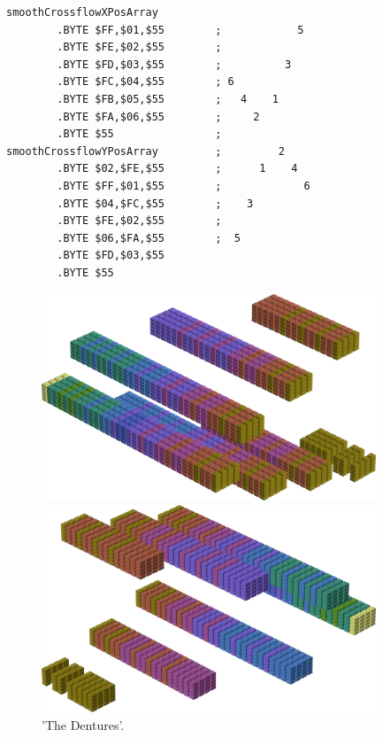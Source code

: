 \begin{minipage}[b]{0.48\linewidth}
\begin{lrbox}{\mybox}%
\begin{lstlisting}[basicstyle=\ttfamily\tiny,escapechar=\%]
smoothCrossflowXPosArray
        .BYTE $FF,$01,$55        ;            5
        .BYTE $FE,$02,$55        ;              
        .BYTE $FD,$03,$55        ;          3   
        .BYTE $FC,$04,$55        ; 6            
        .BYTE $FB,$05,$55        ;   4    1     
        .BYTE $FA,$06,$55        ;     2        
        .BYTE $55                ;              
smoothCrossflowYPosArray         ;         2    
        .BYTE $02,$FE,$55        ;      1    4  
        .BYTE $FF,$01,$55        ;             6
        .BYTE $04,$FC,$55        ;    3         
        .BYTE $FE,$02,$55        ;              
        .BYTE $06,$FA,$55        ;  5           
        .BYTE $FD,$03,$55
        .BYTE $55
\end{lstlisting}
\end{lrbox}%
\scalebox{0.8}{\usebox{\mybox}}

\end{minipage}
%
%
\begin{minipage}[b]{0.48\linewidth}
\begin{figure}[H]
    \centering
    \begin{adjustbox}{width=5cm,margin=0cm 0cm}
      \includegraphics[width=10cm]{src/colorspace_patterns/pattern2-45.png}%
    \end{adjustbox}
    \begin{adjustbox}{width=5cm,margin=0cm 0cm}
      \includegraphics[width=10cm]{src/colorspace_patterns/pattern2-225.png}%
    \end{adjustbox}
\caption{'The Dentures'.}
\end{figure}
\end{minipage}
